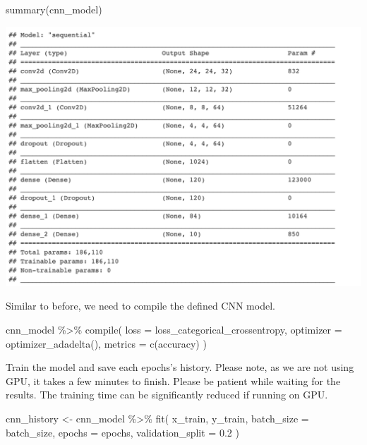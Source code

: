 \documentclass[
  12pt,
]{krantz}
\makeatletter
\newenvironment{Shaded}{\begin{snugshade}}{\end{snugshade}}
\newcommand{\AttributeTok}[1]{\textcolor[rgb]{0.61,0.61,0.61}{#1}}
\newcommand{\FloatTok}[1]{\textcolor[rgb]{0.06,0.06,0.06}{#1}}
\newcommand{\FunctionTok}[1]{\textcolor[rgb]{0,0,0}{#1}}
\newcommand{\NormalTok}[1]{#1}
\newcommand{\OtherTok}[1]{\textcolor[rgb]{0.37,0.37,0.37}{#1}}
\newcommand{\SpecialCharTok}[1]{\textcolor[rgb]{0,0,0}{#1}}
\newcommand{\StringTok}[1]{\textcolor[rgb]{0.5,0.5,0.5}{#1}}
\newenvironment{kframe}{%
\medskip{}
\setlength{\fboxsep}{.8em}
 \def\at@end@of@kframe{}%
 \ifinner\ifhmode%
  \def\at@end@of@kframe{\end{minipage}}%
  \begin{minipage}{\columnwidth}%
 \fi\fi%
 \def\FrameCommand##1{\hskip\@totalleftmargin \hskip-\fboxsep
 \colorbox{shadecolor}{##1}\hskip-\fboxsep
     \hskip-\linewidth \hskip-\@totalleftmargin \hskip\columnwidth}%
 \MakeFramed {\advance\hsize-\width
   \@totalleftmargin\z@ \linewidth\hsize
   \@setminipage}}%
 {\par\unskip\endMakeFramed%
 \at@end@of@kframe}
\renewenvironment{Shaded}{\begin{kframe}}{\end{kframe}}
\makeatother
\begin{document}
\begin{Shaded}
\begin{Highlighting}[]
\FunctionTok{summary}\NormalTok{(cnn\_model)}
\end{Highlighting}
\end{Shaded}

\includegraphics[width=1\textwidth,height=\textheight]{images/cnn_summary.png}

Similar to before, we need to compile the defined CNN model.

\begin{Shaded}
\begin{Highlighting}[]
\NormalTok{cnn\_model }\SpecialCharTok{\%\textgreater{}\%} \FunctionTok{compile}\NormalTok{(}
  \AttributeTok{loss =}\NormalTok{ loss\_categorical\_crossentropy,}
  \AttributeTok{optimizer =} \FunctionTok{optimizer\_adadelta}\NormalTok{(),}
  \AttributeTok{metrics =} \FunctionTok{c}\NormalTok{(}\StringTok{\textquotesingle{}accuracy\textquotesingle{}}\NormalTok{)}
\NormalTok{)}
\end{Highlighting}
\end{Shaded}

Train the model and save each epochs's history. Please note, as we are not using GPU, it takes a few minutes to finish. Please be patient while waiting for the results. The training time can be significantly reduced if running on GPU.

\begin{Shaded}
\begin{Highlighting}[]
\NormalTok{cnn\_history }\OtherTok{\textless{}{-}}\NormalTok{ cnn\_model }\SpecialCharTok{\%\textgreater{}\%} \FunctionTok{fit}\NormalTok{(}
\NormalTok{  x\_train, y\_train,}
  \AttributeTok{batch\_size =}\NormalTok{ batch\_size,}
  \AttributeTok{epochs =}\NormalTok{ epochs,}
  \AttributeTok{validation\_split =} \FloatTok{0.2}
\NormalTok{)}
\end{Highlighting}
\end{Shaded}
\end{document}
